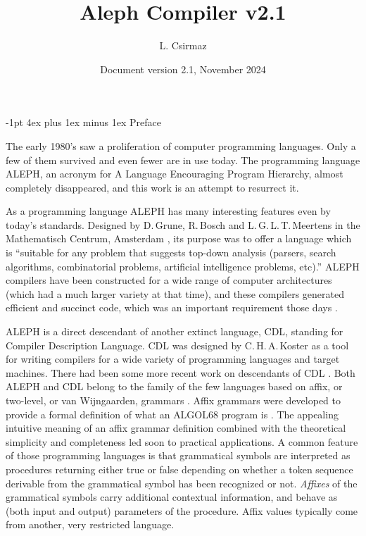 \documentclass[titlepage]{article}
\title{\bf Aleph Compiler v2.1}
\author{L. Csirmaz}
\date{\normalsize Document version 2.1, November 2024}
\makeatletter
\newcommand\A{\textsf{ALEPH}}
\newcommand\g[1]{\textsf{#1}}
\renewcommand\section{%
\newpage
\@startsection{section}{1}{\z@}%
   {-1pt}%
   {4ex plus 1ex minus 1ex}%
   {\normalfont\Large\bfseries}}
\let\osection\section
\def\section {\newpage\osection}
\makeatother
\begin{document}
\thispagestyle{empty}
\maketitle
\newpage


\section{Preface}

The early 1980's saw a proliferation of computer programming languages. Only a
few of them survived and even fewer are in use today. The programming
language \A, an acronym for {\sf A} {\sf L}anguage {\sf E}ncouraging {\sf
P}rogram {\sf H}ierarchy, almost completely disappeared, and this work is an
attempt to resurrect it.

As a programming language \A{} has many interesting features even by today's
standards. Designed by D.\,Grune, R.\,Bosch and L.\,G.\,L.\,T.\,Meertens in
the Mathematisch Centrum, Amsterdam \cite{A-manual}, its purpose was to
offer a language which is ``suitable for any problem that suggests top-down
analysis (parsers, search algorithms, combinatorial problems, artificial
intelligence problems, etc).'' \A{} compilers have been constructed for a
wide range of computer architectures (which had a much larger variety at
that time), and these compilers generated efficient and succinct code, which
was an important requirement those days \cite{grune}.

\A{} is a direct descendant of another extinct language, \g{CDL}, standing
for {\sf C}ompiler {\sf D}escription {\sf L}anguage. \g{CDL} was designed by
C.\,H.\,A.\,Koster \cite{koster1,koster3} as a tool for writing compilers
for a wide variety of programming languages and target machines. There had
been some more recent work on descendants of \g{CDL} \cite{cdl3}. Both \A{}
and \g{CDL} belong to the family of the few languages based on affix, or
two-level, or van Wijngaarden, grammars \cite{koster2,wijn}. Affix grammars
were developed to provide a formal definition of what an \g{ALGOL68} program
is \cite{a68}. The appealing intuitive meaning of an affix grammar
definition combined with the theoretical simplicity and completeness led
soon to practical applications. A common feature of those programming
languages is that grammatical symbols are interpreted as procedures
returning either true or false depending on whether a token sequence
derivable from the grammatical symbol has been recognized or not.
\emph{Affixes} of the grammatical symbols carry additional contextual
information, and behave as (both input and output) parameters of the
procedure. Affix values typically come from another, very restricted
language.
\end{document}
